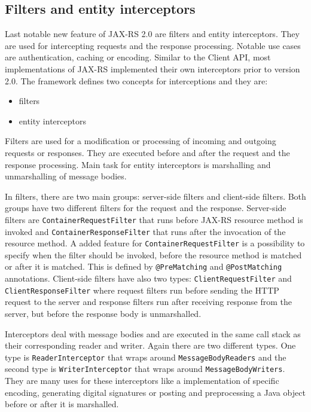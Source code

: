 \documentclass[12pt,final,oneside]{fithesis2}
\begin{document}
\subsection*{Filters and entity interceptors}
Last notable new feature of JAX-RS 2.0 are filters and entity interceptors. They are used for intercepting requests and the response processing. Notable use cases are authentication, caching or encoding. Similar to the Client API, most implementations of JAX-RS implemented their own interceptors prior to version 2.0. The framework defines two concepts for interceptions and they are:
\begin{itemize}
\item 
filters

\item
entity interceptors
\end{itemize}

Filters are used for a modification or processing of incoming and outgoing requests or responses. They are executed before and after the request and the response processing. Main task for entity interceptors is marshalling and unmarshalling of message bodies.

In filters, there are two main groups: server-side filters and client-side filters. Both groups have two different filters for the request and  the response. Server-side filters are \texttt{ContainerRequestFilter} that runs before JAX-RS resource method is invoked and \texttt{ContainerResponseFilter} that runs after the invocation of the resource method. A added feature for \texttt{ContainerRequestFilter} is a possibility to specify when the filter should be invoked, before the resource method is matched or after it is matched. This is defined by \texttt{@PreMatching} and \texttt{@PostMatching} annotations. Client-side filters have also two types: \texttt{ClientRequestFilter} and \texttt{ClientResponseFilter} where request filters run before sending the HTTP request to the server and response filters run after receiving response from the server, but before the response body is unmarshalled. \cite{jax-rs-2.0}\cite{resteasy-book}

Interceptors deal with message bodies and are executed in the same call stack as their corresponding reader and writer. Again there are two different types. One type is \texttt{ReaderInterceptor} that wraps around \texttt{MessageBodyReaders} and the second type is \texttt{WriterInterceptor} that wraps around \texttt{MessageBodyWriters}. They are many uses for these interceptors like a implementation of specific encoding, generating digital signatures or posting and preprocessing a Java object before or after it is marshalled.\cite{jax-rs-2.0}\cite{cxf-jax}
\end{document}
